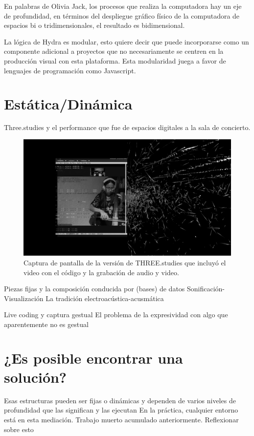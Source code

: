En palabras de Olivia Jack, los procesos que realiza la computadora hay un eje de profundidad, en términos del despliegue gráfico físico de la computadora de espacios bi o tridimensionales, el resultado es bidimensional.

La lógica de Hydra es modular, esto quiere decir que puede incorporarse como un componente adicional a proyectos que no necesariamente se centren en la producción visual con esta plataforma. Esta modularidad juega a favor de lenguajes de programación como Javascript. 


\section{Estática/Dinámica}

Three.studies y el performance que fue de espacios digitales a la sala de concierto.

\begin{figure} 
  \includegraphics[width=\columnwidth]{../img/threeNw.png} 
\caption[THREE.studies - Iracema de Andrade]{Captura de pantalla de la versión de THREE.studies que incluyó el video con el código y la grabación de audio y video.} %
\label{fig:gallery} 
\end{figure}

\clearpage


Piezas fijas y la composición conducida por (bases) de datos 
Sonificación-Visualización
La tradición electroacústica-acusmática 

Live coding y captura gestual 
El problema de la expresividad con algo que aparentemente no es gestual 

\section{¿Es posible encontrar una solución?}

Esas estructuras pueden ser fijas o dinámicas y dependen de varios niveles de profundidad que las significan y las ejecutan
En la práctica, cualquier entorno está en esta mediación. Trabajo muerto acumulado anteriormente. Reflexionar sobre esto
